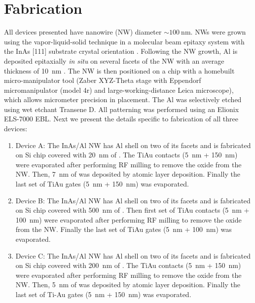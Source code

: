 \section{Fabrication}
\label{sec:majo_D}

All devices presented have nanowire (NW) diameter  $\sim \SI{100}{\nano\meter}$. NWs were grown using the vapor-liquid-solid technique in a molecular beam epitaxy system with the InAs [111] substrate crystal orientation \cite{Krogstrup}. Following the NW growth, Al is deposited epitaxially \textit{in situ} on several facets of the NW with an average thickness of \SI{10}{\nano\meter} \cite{Krogstrup,MT1}. The NW is then positioned on a chip with a homebuilt micro-manipulator tool (Zaber XYZ-Theta stage with Eppendorf micromanipulator (model 4r) and large-working-distance Leica microscope), which allows micrometer precision in placement. The Al was selectively etched using wet etchant Transene D. All patterning was performed using an Elionix ELS-7000 EBL. Next we present the details specific to fabrication of all three devices:

\begin{enumerate}
\item Device A: The InAs/Al NW has Al shell on two of its facets and is fabricated on Si chip covered with \SI{20}{\nano\meter} of . The TiAu contacts (\SI{5}{\nano\meter} + \SI{150}{\nano\meter}) were evaporated after performing RF milling to remove the oxide from the NW. Then, \SI{7}{\nano\meter} of  was deposited by atomic layer deposition. Finally the last set of TiAu gates (\SI{5}{\nano\meter} + \SI{150}{\nano\meter}) was evaporated.

\item Device B: The InAs/Al NW has Al shell on two of its facets and is fabricated on Si chip covered with \SI{500}{\nano\meter} of . Then first set of TiAu contacts (\SI{5}{\nano\meter} + \SI{100}{\nano\meter}) were evaporated after performing RF milling to remove the oxide from the NW. Finally the last set of TiAu gates (\SI{5}{\nano\meter} + \SI{100}{\nano\meter}) was evaporated.

\item Device C: The InAs/Al NW has Al shell on two of its facets and is fabricated on Si chip covered with \SI{200}{\nano\meter}  of . The TiAu contacts (\SI{5}{\nano\meter} + \SI{150}{\nano\meter}) were evaporated after performing RF milling to remove the oxide from the NW. Then, \SI{5}{\nano\meter} of  was deposited by atomic layer deposition. Finally the last set of Ti-Au gates (\SI{5}{\nano\meter} + \SI{150}{\nano\meter}) was evaporated.
\end{enumerate}